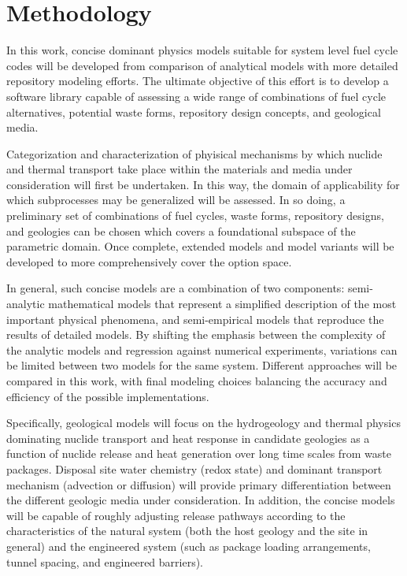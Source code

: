 \section{Methodology} 

In this work, concise dominant physics models suitable for system 
level fuel cycle codes will be developed from comparison of analytical 
models with more detailed repository modeling efforts. The ultimate 
objective of this effort is to develop a software library capable of 
assessing a wide range of combinations of fuel cycle alternatives, 
potential waste forms, repository design concepts, and geological 
media. 

Categorization and characterization of phyisical mechanisms by which 
nuclide and thermal transport take place within the materials and 
media under consideration will first be undertaken. In this way, the 
domain of applicability for which subprocesses may be generalized will 
be assessed. In so doing, a preliminary set of combinations of fuel 
cycles, waste forms, repository designs, and geologies can be chosen 
which covers a foundational subspace of the parametric domain. Once 
complete, extended models and model variants will be developed to more 
comprehensively cover the option space.  

In general, such concise models are a combination of two components: 
semi-analytic mathematical models that represent a simplified 
description of the most important physical phenomena, and 
semi-empirical models that reproduce the results of detailed models.  
By shifting the emphasis between the complexity of the analytic models 
and regression against numerical experiments, variations can be 
limited between two models for the same system.  Different approaches 
will be compared in this work, with final modeling choices balancing 
the accuracy and efficiency of the possible implementations.  

Specifically, geological models will focus on the hydrogeology and 
thermal physics dominating nuclide transport and heat response in 
candidate geologies as a function of nuclide release and heat 
generation over long time scales from waste packages.  Disposal site 
water chemistry (redox state) and dominant transport mechanism 
(advection or diffusion) will provide primary differentiation between 
the different geologic media under consideration. In addition, the 
concise models will be capable of roughly adjusting release pathways 
according to the characteristics of the natural system (both the host 
geology and the site in general) and the engineered system (such as 
package loading arrangements, tunnel spacing, and engineered 
barriers).

